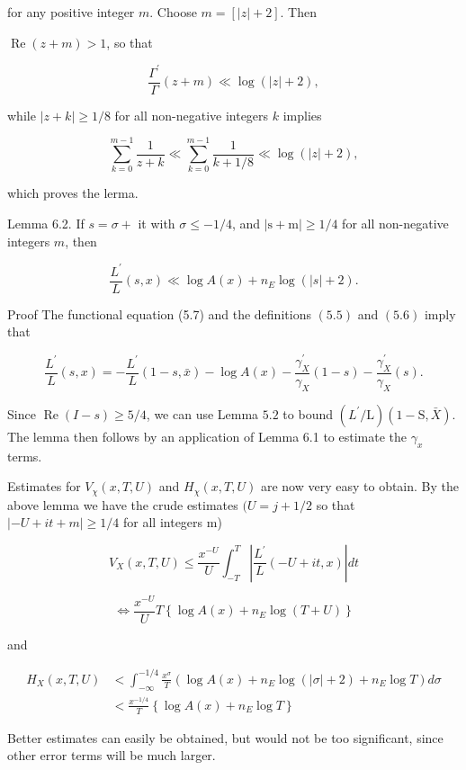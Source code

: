 for any positive integer $m$. Choose $m=[|z|+2]$. Then

$\operatorname{Re}(z+m)>1$, so that

$$
\frac{\Gamma^{\prime}}{\Gamma}(z+m) \ll \log (|z|+2),
$$

while $|z+k| \geqslant 1 / 8$ for all non-negative integers $k$ implies

$$
\sum_{k=0}^{m-1} \frac{1}{z+k} \ll \sum_{k=0}^{m-1} \frac{1}{k+1 / 8} \ll \log (|z|+2),
$$

which proves the lerma.

Lemma 6.2. If $s=\sigma+$ it with $\sigma \leqslant-1 / 4$, and $|\mathrm{s}+\mathrm{m}| \geqslant 1 / 4$ for all non-negative integers $m$, then

$$
\frac{L^{\prime}}{L}(s, x) \ll \log A(x)+n_{E} \log (|s|+2) .
$$

Proof The functional equation (5.7) and the definitions $(5.5)$ and $(5.6)$ imply that

$$
\frac{L^{\prime}}{L}(s, x)=-\frac{L^{\prime}}{L}(1-s, \bar{x})-\log A(x)-\frac{\gamma_{X}^{\prime}}{\gamma_{X}}(1-s)-\frac{\gamma_{X}^{\prime}}{\gamma_{X}}(s) .
$$

Since $\operatorname{Re}(I-s) \geqslant 5 / 4$, we can use Lemma $5.2$ to bound $\left(L^{\prime} / \mathrm{L}\right)(1-\mathrm{S}, \bar{X})$. The lemma then follows by an application of Lemma 6.1 to estimate the $\gamma_{x}$ terms.

Estimates for $V_{\chi}(x, T, U)$ and $H_{\chi}(x, T, U)$ are now very easy to obtain. By the above lemma we have the crude estimates $(U=j+1 / 2$ so that $|-U+i t+m| \geqslant 1 / 4$ for all integers m)

$$
V_{X}(x, T, U) \leqslant \frac{x^{-U}}{U} \int_{-T}^{T}\left|\frac{L^{\prime}}{L}(-U+i t, x)\right| d t
$$

$$
\Leftrightarrow \frac{x^{-U}}{U} T\left\{\log A(x)+n_{E} \log (T+U)\right\}
$$

and

$$
\begin{aligned}
H_{X}(x, T, U) &<\int_{-\infty}^{-1 / 4} \frac{x^{\sigma}}{T}\left(\log A(x)+n_{E} \log (|\sigma|+2)+n_{E} \log T\right) d \sigma \\
&<\frac{x^{-1 / 4}}{T}\left\{\log A(x)+n_{E} \log T\right\}
\end{aligned}
$$

Better estimates can easily be obtained, but would not be too significant, since other error terms will be much larger.

